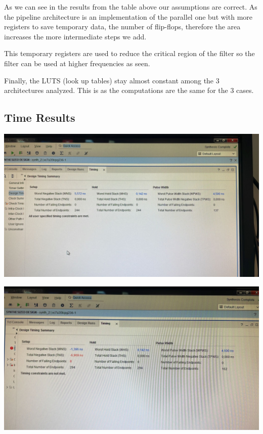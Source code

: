 \documentclass[a4paper, 12pt]{article}
\begin{document}
As we can see in the results from the table above our assumptions are correct. As the pipeline architecture is an implementation of the parallel one but with more registers to save temporary data, the number of flip-flops, therefore the area increases the more intermediate steps we add.

This temporary registers are used to reduce the critical region of the filter so the filter can be used at higher frequencies as seen.

Finally, the LUTS (look up tables) stay almost constant among the 3 architectures analyzed. This is as the computations are the same for the 3 cases.
\subsection{Time Results}
\label{sec:org8af061c}
\begin{center}
\includegraphics[width=.9\linewidth]{./img/time_report_parallel.jpg}
\end{center}

\begin{center}
\includegraphics[width=.9\linewidth]{./img/time_report_pipeline_simple.jpg}
\end{center}
\end{document}

